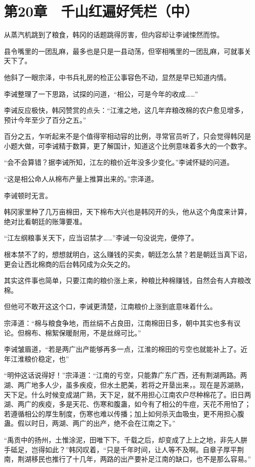 \section{第20章　千山红遍好凭栏（中）}

从蒸汽机跳到了粮食，韩冈的话题跳得厉害，但内容却让李诫悚然而惊。

县令嘴里的一团乱麻，最多也是只是一县动荡，但宰相嘴里的一团乱麻，可就事关天下了。

他斜了一眼宗泽，中书兵礼房的检正公事容色不动，显然是早已知道内情。

李诫整理了一下思路，试探的问道，“相公，可是今年的收成……”

李诫反应极快，韩冈赞赏的点头：“江淮之地，这几年弃粮改棉的农户愈见增多，预计今年至少了百分之五。”

百分之五，乍听起来不是个值得宰相动容的比例，寻常官员听了，只会觉得韩冈是小题大做，可李诫精于数算，更了解国计，知道这个比例意味着多大的一个数字。

“会不会算错？据李诫所知，江左的粮价近年没多少变化。”李诫怀疑的问道。

“这是相公命人从棉布产量上推算出来的。”宗泽道。

李诫顿时无言。

韩冈家里种了几万亩棉田，天下棉布大兴也是韩冈开的头，他从这个角度来计算，绝对比看朝廷的账簿要准。

“江左纲粮事关天下，应当诏禁才……”李诫一句没说完，便停了。

根本禁不了的，想想就明白，这么赚钱的买卖，朝廷怎么禁？若是朝廷当真下诏，更会让西北棉商的后台韩冈成为众矢之的。

其实这件事也简单，只要江南的粮价涨上来，种粮比种棉赚钱，自然会有人弃粮改棉。

但他可不敢开这这个口，李诫更清楚，江南粮价上涨到底意味着什么。

宗泽道：“棉与粮食争地，而丝绢不占良田，江南棉田日多，朝中其实也多有议论。但棉布、棉絮保暖耐用，不是丝绵可比。”

李诫皱眉道，“若是两广出产能够再多一点，江淮的棉田的亏空也就能补上了。近年江淮粮价稳定，也”

“明仲这话说得好！”宗泽道：“江南的亏空，只能靠广东广西，还有荆湖两路。两湖、两广地多人少，虽多疾疫，但水土肥美，若将之开垦出来，。现在是苏湖熟，天下足。什么时候变成湖广熟，天下足，就不用担心江南农户尽种棉花了。旧日两湖、两广的疾疫，多是天花、伤寒和腹蛊，如今有了相公的牛痘，天花不用怕了；若遵循相公的厚生制度，伤寒也难以传播；加上如何杀灭血吸虫，更不用担心腹蛊。假以时日，两湖、两广的出产，绝不会在江南之下。”

“禹贡中的扬州，土惟涂泥，田唯下下。千载之后，却变成了上上之地，非先人胼手砥足，岂得如此？”韩冈叹着，“只是千年时间，让人等不及啊。自章子厚平荆南，荆湖移民也推行了十几年，两路的出产要补足江南的缺口，也不是那么容易。”

